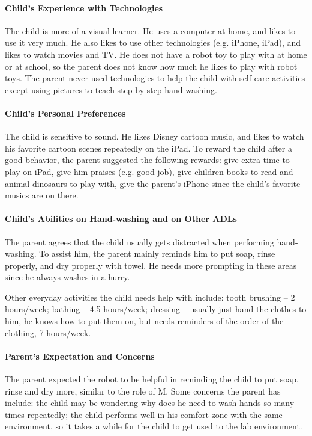 \paragraph{Child's Experience with Technologies}
The child is more of a visual learner.  He uses a computer at home, and likes to use it very much.  He also likes to use other technologies (e.g. iPhone, iPad), and likes to watch movies and TV.  He does not have a robot toy to play with at home or at school, so the parent does not know how much he likes to play with robot toys.  The parent never used technologies to help the child with self-care activities except using pictures to teach step by step hand-washing.

\paragraph{Child's Personal Preferences}
The child is sensitive to sound.  He likes Disney cartoon music, and likes to watch his favorite cartoon scenes repeatedly on the iPad.  To reward the child after a good behavior, the parent suggested the following rewards: give extra time to play on iPad, give him praises (e.g. good job), give children books to read and animal dinosaurs to play with, give the parent's iPhone since the child's favorite musics are on there.

\paragraph{Child's Abilities on Hand-washing and on Other ADLs}
The parent agrees that the child usually gets distracted when performing hand-washing.  To assist him, the parent mainly reminds him to put soap, rinse properly, and dry properly with towel.  He needs more prompting in these areas since he always washes in a hurry.

Other everyday activities the child needs help with include:  tooth brushing -- 2 hours/week; bathing -- 4.5 hours/week; dressing -- usually just hand the clothes to him, he knows how to put them on, but needs reminders of the order of the clothing, 7 hours/week.

\paragraph{Parent's Expectation and Concerns}
The parent expected the robot to be helpful in reminding the child to put soap, rinse and dry more, similar to the role of M.  Some concerns the parent has include: the child may be wondering why does he need to wash hands so many times repeatedly; the child performs well in his comfort zone with the same environment, so it takes a while for the child to get used to the lab environment.

